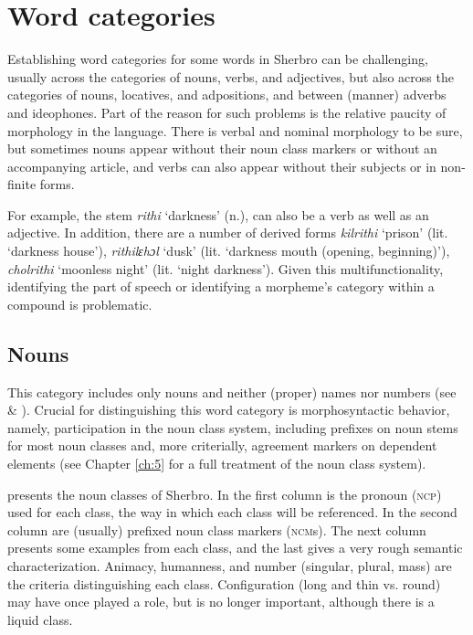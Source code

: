 \chapter{Word categories}
\label{ch:3}\label{sec:3}\hypertarget{Toc115517759}{}
Establishing word categories for some words in Sherbro can be challenging, usually across the categories of nouns, verbs, and adjectives, but also across the categories of nouns, locatives, and adpositions, and between (manner) adverbs and ideophones. Part of the reason for such problems is the relative paucity of morphology in the language. There is verbal and nominal morphology to be sure, but sometimes nouns appear without their noun class markers or without an accompanying article, and verbs can also appear without their subjects or in non-finite forms.

For example, the stem \textit{rithi} ‘darkness' (n.), can also be a verb as well as an adjective. In addition, there are a number of derived forms \textit{kilrithi} ‘prison' (lit. ‘darkness house'), \textit{rithilɛhɔl}  ‘dusk' (lit. ‘darkness mouth (opening, beginning)'), \textit{cholrithi} ‘moonless night' (lit. ‘night darkness'). Given this multifunctionality, identifying the part of speech or identifying a morpheme's category within a compound is problematic.

\section{Nouns}
\label{sec:3.1}\hypertarget{Toc115517760}{}
This category includes only nouns and neither (proper) names nor numbers (see  \& ). Crucial for distinguishing this word category is morphosyntactic behavior, namely, participation in the noun class system, including prefixes on noun stems for most noun classes and, more criterially, agreement markers on dependent elements (see Chapter \ref{ch:5} for a full treatment of the noun class system).

 presents the noun classes of Sherbro. In the first column is the pronoun (\textsc{ncp}) used for each class, the way in which each class will be referenced. In the second column are (usually) prefixed noun class markers (\textsc{ncm}s). The next column presents some examples from each class, and the last gives a very rough semantic characterization. Animacy, humanness, and number (singular, plural, mass) are the criteria distinguishing each class. Configuration (long and thin vs. round) may have once played a role, but is no longer important, although there is a liquid class.

